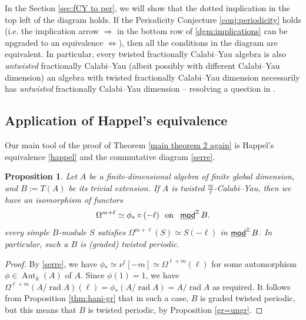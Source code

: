 \documentclass[a4paper,reqno,11pt]{amsart}
\newtheorem{proposition}[theorem]{Proposition}
\theoremstyle{definition}
\newcommand{\DDD}{\mathsf{D}}
\newcommand{\Z}{\mathbb{Z}}
\newcommand{\bo}{\operatorname{b}\nolimits}
\newcommand{\rad}{\operatorname{rad}\nolimits}
\newcommand{\Aut}{\operatorname{Aut}\nolimits}
\newcommand{\stmod}{\mathop{\underline{\mod}}\nolimits}
\newcommand{\new}[1]{{\blue #1}}
\newcommand{\old}[1]{{\red #1}}
\numberwithin{equation}{section}
\begin{document}
In the Section \ref{sec:fCY to per}, we will show that the dotted implication in the top left of the diagram holds.
If the Periodicity Conjecture \ref{conj:periodicity} holds (i.e. the implication arrow $\Rightarrow$ in the bottom row of \eqref{dgm:implications} can be upgraded to an equivalence $\Leftrightarrow$),
then all the conditions in the diagram are equivalent. In particular, every twisted fractionally Calabi--Yau algebra is also \emph{untwisted} fractionally Calabi--Yau (albeit possibly with different Calabi--Yau dimension)
  an algebra with twisted fractionally Calabi--Yau dimension necessarily has \emph{untwisted} fractionally Calabi--Yau dimension
  -- resolving a question in \cite[Remark 1.6(b)]{HerIya}.

\new{
\subsection{Application of Happel's equivalence}

Our main tool of the proof of Theorem \ref{main theorem 2 again} is Happel's equivalence \eqref{happel} and the commutative diagram \eqref{serre}.}


\begin{proposition}\label{tw-fCY to tw-pe}
Let $A$ be a finite-dimensional algebra of finite global dimension, and $B:=T(A)$ be its trivial extension.
If $A$ is twisted $\frac{m}{\ell}$-Calabi--Yau, then \new{we have an isomorphism of functors
\[\Omega^{m+\ell}\simeq\phi_*\circ(-\ell)\ \mbox{ on }\ \stmod^\Z B.\]}
\old{every simple $B$-module $S$ satisfies $\Omega^{m+\ell}(S)\simeq S(-\ell)$ in $\stmod^\Z B$.}
In particular, such a $B$ is (graded) twisted periodic.
\end{proposition}

\begin{proof}
By \eqref{serre}, we have $\phi_*\simeq\nu^\ell[-m]\simeq \Omega^{\ell+m}(\ell)$ for some automorphism $\phi\in \Aut_k(A)$ of $A$.
\old{Since $\phi(1)=1$, we have $\Omega^{\ell+m}(A/\rad A)(\ell)=\phi_*(A/\rad A)=A/\rad A$ as required.}
It follows from Proposition \ref{thm:hani-gr} that in such a case, $B$ is graded twisted periodic, but this means that $B$ is twisted periodic, by Proposition \ref{gr=ungr}.
\end{proof}
\end{document}

